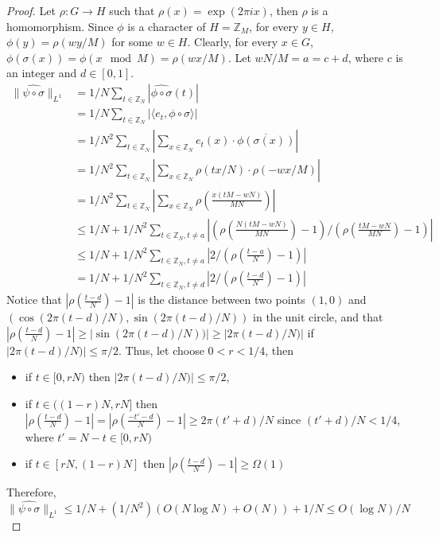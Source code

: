 \begin{proof}
Let $\rho: G \rightarrow H$ such that $\rho(x) = \exp(2 \pi i x)$, then $\rho$ is a homomorphism. Since $\phi$ is a character of $H = \mathbb{Z}_M$, for every $y \in H$, 
$\phi(y) = \rho (wy/M)$ for some $w \in H$. Clearly, for every $x \in G$, $\phi(\sigma(x)) = \phi(x \mod M) = \rho(wx/M)$. Let $wN/M = a = c+d$, where $c$ is an integer and $d \in [0,1]$. 
\begin{align*}
\| \widehat{\psi \circ \sigma} \|_{L^1}
& = 1/N \sum\limits_{t \in \mathbb{Z}_N} |\widehat{\phi \circ \sigma}(t) | \\
& = 1/ N  \sum\limits_{t \in \mathbb{Z}_N} 
	\left| \langle e_t, \phi \circ \sigma \rangle  \right| \\
& = 1/ N^2  \sum\limits_{t \in \mathbb{Z}_N} 
	\left| \sum\limits_{x \in \mathbb{Z}_N} 
		 e_t(x) \cdot \overline{\phi(\sigma(x))} \right| \\	
& = 1/ N^2  \sum\limits_{t \in \mathbb{Z}_N} 
	\left| \sum\limits_{x \in \mathbb{Z}_N} 
		 \rho(tx/N) \cdot \rho(-wx/M)  \right| \\
& = 1/ N^2  \sum\limits_{t \in \mathbb{Z}_N} 
	\left| \sum\limits_{x \in \mathbb{Z}_N} 
		 \rho \left( \frac{x(tM-wN)}{MN} \right) \right| \\
& \leq 1/N + 1/ N^2  \sum\limits_{t \in \mathbb{Z}_N, t \neq a} 
	\left|
		 \left(\rho \left( \frac{N(tM-wN)}{MN} \right) - 1 \right) \Big/
		 \left(\rho \left( \frac{tM-wN}{MN} \right) - 1 \right) \right| \\	
& \leq 1/N + 1/ N^2  \sum\limits_{t \in \mathbb{Z}_N, t \neq a} 
	\left|
		 2 \Big/
		 \left(\rho \left( \frac{t-a}{N} \right) - 1 \right) \right| \\	
& = 1/N + 1/ N^2  \sum\limits_{t \in \mathbb{Z}_N, t \neq d} 
	\left|
		 2 \Big/
		 \left(\rho \left( \frac{t-d}{N} \right) - 1 \right) \right| 		
\end{align*}
Notice that $\left| \rho \left( \frac{t-d}{N} \right) - 1 \right|$ is the distance between two points $(1,0)$ and $(\cos(2\pi(t-d)/N), \sin (2\pi (t-d)/N))$ in the unit circle, and that $\left| \rho \left( \frac{t-d}{N} \right) - 1 \right| \geq |\sin (2\pi (t-d)/N))| \geq |2\pi (t-d)/N)|$ if $|2\pi (t-d)/N)| \leq \pi /2$. Thus, let choose $0 < r < 1/4$, then 
\begin{itemize}
\item if $t \in [0, rN)$ then $|2\pi (t-d)/N)| \leq \pi /2$,
\item if $t \in ((1-r)N, rN]$ then 
$\left| \rho \left( \frac{t-d}{N} \right) - 1 \right| 
= \left| \rho \left( \frac{-t'-d}{N} \right) - 1 \right|
\geq 2 \pi (t'+d)/N$ since $(t'+d)/N < 1/4$, where $t'= N-t \in [0, rN)$
\item if $t \in [rN, (1-r)N] $ then $\left| \rho \left( \frac{t-d}{N} \right) - 1 \right| \geq \Omega(1)$ 
\end{itemize}
Therefore, 
$$\| \widehat{\psi \circ \sigma} \|_{L^1} \leq 1/N + (1/N^2) (O(N \log N) + O(N)) + 1/N \leq O(\log N)/N $$
\end{proof}
